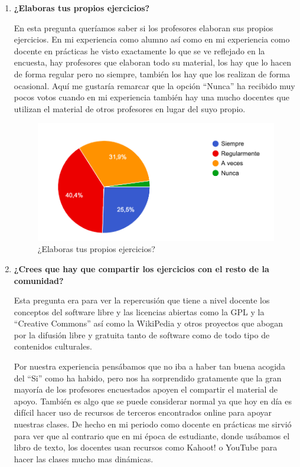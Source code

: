 \begin{enumerate}
\item \textbf{¿Elaboras tus propios ejercicios?}

En esta pregunta queríamos saber si los profesores elaboran sus propios ejercicios. En mi experiencia como alumno así como en mi experiencia como docente en prácticas he visto exactamente lo que se ve reflejado en la encuesta, hay profesores que elaboran todo su material, los hay que lo hacen de forma regular pero no siempre, también los hay que los realizan de forma ocasional. Aquí me gustaría remarcar que la opción ``Nunca'' ha recibido muy pocos votos cuando en mi experiencia también hay una mucho docentes que utilizan el material de otros profesores en lugar del suyo propio.

\begin{figure}[H]
\centering
\includegraphics[width=1.0\textwidth]{../images/quiz_3}
\caption{¿Elaboras tus propios ejercicios?}
\label{fig:quiz_3}
\end{figure}

\item \textbf{¿Crees que hay que compartir los ejercicios con el resto de la comunidad?}

Esta pregunta era para ver la repercusión que tiene a nivel docente los conceptos del software libre y las licencias abiertas como la GPL y la ``Creative Commons'' \cite{comons_creative_2013} así como la WikiPedia y otros proyectos que abogan por la difusión libre y gratuita tanto de software como de todo tipo de contenidos culturales.

\bigskip
Por nuestra experiencia pensábamos que no iba a haber tan buena acogida del ``Si'' como ha habido, pero nos ha sorprendido gratamente que la gran mayoría de los profesores encuestados apoyen el compartir el material de apoyo. También es algo que se puede considerar normal ya que hoy en día es difícil hacer uso de recursos de terceros encontrados online para apoyar nuestras clases. De hecho en mi periodo como docente en prácticas me sirvió para ver que al contrario que en mi época de estudiante, donde usábamos el libro de texto, los docentes usan recursos como Kahoot! o YouTube para hacer las clases mucho mas dinámicas.


\end{enumerate}
